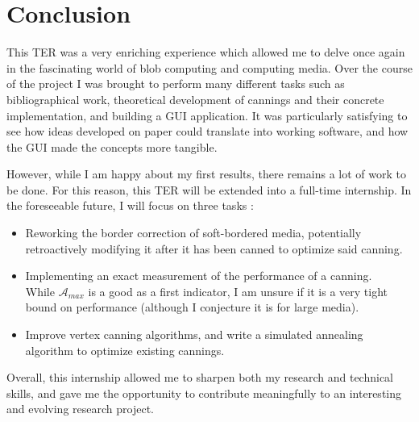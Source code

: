 \documentclass{article}
\begin{document}
\section*{Conclusion}
\label{conclusion}

This TER was a very enriching experience which allowed me to delve once again in the fascinating world of blob computing and computing media. Over the course of the project I was brought to perform many different tasks such as bibliographical work, theoretical development of cannings and their concrete implementation, and building a GUI application. It was particularly satisfying to see how ideas developed on paper could translate into working software, and how the GUI made the concepts more tangible.

However, while I am happy about my first results, there remains a lot of work to be done. For this reason, this TER will be extended into a full-time internship. In the foreseeable future, I will focus on three tasks :
\begin{itemize}[label=-]
	\item Reworking the border correction of soft-bordered media, potentially retroactively modifying it after it has been canned to optimize said canning.
	\item Implementing an exact measurement of the performance of a canning.\\
	While $\mathcal{A}_{max}$ is a good as a first indicator, I am unsure if it is a very tight bound on performance (although I conjecture it is for large media).
	\item Improve vertex canning algorithms, and write a simulated annealing algorithm to optimize existing cannings.
\end{itemize}

Overall, this internship allowed me to sharpen both my research and technical skills, and gave me the opportunity to contribute meaningfully to an interesting and evolving research project.

\printbibliography[heading=bibintoc]
\end{document}
